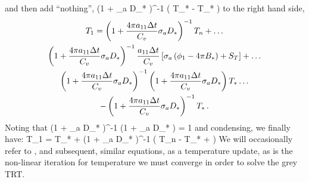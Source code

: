 and then add ``nothing'',
\benum
\left(1 +  \sigma_a D_*  \right)^{-1} \left( T_* - T_* \right) \pec
\eenum
to the right hand side,
\begin{multline}
T_1 = \left(1 + \frac{4\pi a_{11} \Delta t}{C_v} \sigma_a D_*  \right)^{-1} T_n + \dots \\
\left(1 + \frac{4\pi a_{11} \Delta t}{C_v} \sigma_a D_*  \right)^{-1} \frac{a_{11} \Delta t }{C_v} \left[ \sigma_a \left( \phi_1 - 4\pi   B_* \right) + S_T \right] + \dots \\
\left(1 + \frac{4\pi a_{11} \Delta t}{C_v} \sigma_a D_*  \right)^{-1} \left(1 + \frac{ 4\pi a_{11} \Delta t }{C_v} \sigma_a D_* \right) T_* \dots \\
-\left(1 + \frac{4\pi a_{11} \Delta t}{C_v} \sigma_a D_*  \right)^{-1} T_*\, .
\end{multline}
Noting that 
\benum
\left(1 +  \sigma_a D_*  \right)^{-1} \left(1 +  \sigma_a D_* \right)  = 1 \pec
\eenum
and condensing, we finally have:
\benum
T_1 = T_* + \left(1 +  \sigma_a D_*  \right)^{-1} \left( T_n - T_* +    \right) \pep
\label{eq:analytic_t_1}
\eenum
We will occasionally refer to , and subsequent, similar equations, as a temperature update, as  is the non-linear iteration for temperature we must converge in order to solve the grey TRT.

